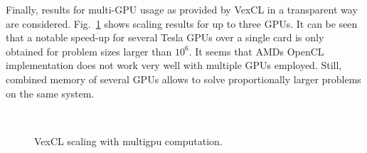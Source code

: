 \documentclass[final]{siamltex}
\newcommand{\figref}[1]{Fig.~\ref{#1}}
\begin{document}

Finally, results for multi-GPU usage as provided by VexCL in a transparent way
are considered. \figref{fig:scaling} shows scaling results for up to three
GPUs. It can be seen that a notable speed-up for several Tesla GPUs over a
single card is only obtained for problem sizes larger than $10^6$.  It seems
that AMDs OpenCL implementation does not work very well with multiple GPUs
employed. Still, combined memory of several GPUs allows to solve proportionally
larger problems on the same system.

\begin{figure}
    \begin{center}
        $\;$
        $\;$
    \end{center}
    \caption{VexCL scaling with multigpu computation.}
    \label{fig:scaling}
\end{figure}
\end{document}
